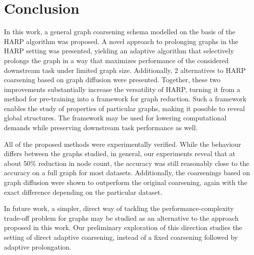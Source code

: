 \section{Conclusion}

In this work, a general graph coarsening schema modelled on the basis of the HARP algorithm was proposed. A novel approach to prolonging graphs in the HARP setting was presented, yielding an adaptive algorithm that selectively prolongs the graph in a way that maximizes performance of the considered downstream task under limited graph size. Additionally, 2 alternatives to HARP coarsening based on graph diffusion were presented. Together, these two improvements substantially increase the versatility of HARP, turning it from a method for pre-training into a framework for graph reduction. Such a framework enables the study of properties of particular graphs, making it possible to reveal global structures. The framework may be used for lowering computational demands while preserving downstream task performance as well.

All of the proposed methods were experimentally verified. While the behaviour differs between the graphs studied, in general, our experiments reveal that at about 50\% reduction in node count, the accuracy was still reasonably close to the accuracy on a full graph for most datasets. Additionally, the coarsenings based on graph diffusion were shown to outperform the original coarsening, again with the exact difference depending on the particular dataset.

In future work, a simpler, direct way of tackling the performance-complexity trade-off problem for graphs may be studied as an alternative to the approach proposed in this work. Our preliminary exploration of this direction \cite{prochazka_downstream_2022} studies the setting of direct adaptive coarsening, instead of a fixed coarsening followed by adaptive prolongation.
